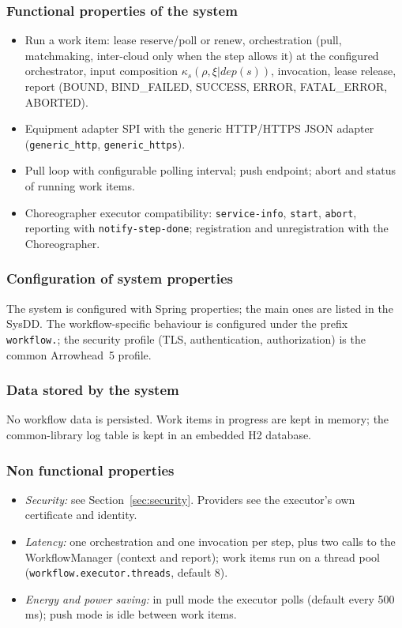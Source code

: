 \documentclass[a4paper]{arrowhead}
\begin{document}
\subsubsection{Functional properties of the system}
\begin{itemize}
\item Run a work item: lease reserve/poll or renew, orchestration (pull, matchmaking, inter-cloud only when the step
allows it) at the configured orchestrator, input composition $\kappa_s(\rho, \xi|dep(s))$, invocation, lease release,
report (BOUND, BIND\_FAILED, SUCCESS, ERROR, FATAL\_ERROR, ABORTED).
\item Equipment adapter SPI with the generic HTTP/HTTPS JSON adapter (\texttt{generic\_http}, \texttt{generic\_https}).
\item Pull loop with configurable polling interval; push endpoint; abort and status of running work items.
\item Choreographer executor compatibility: \texttt{service-info}, \texttt{start}, \texttt{abort}, reporting with
\texttt{notify-step-done}; registration and unregistration with the Choreographer.
\end{itemize}

\subsubsection{Configuration of system properties}
The system is configured with Spring properties; the main ones are listed in the SysDD. The workflow-specific behaviour
is configured under the prefix \texttt{workflow.}; the security profile (TLS, authentication, authorization) is the
common Arrowhead~5 profile.

\subsubsection{Data stored by the system}
No workflow data is persisted. Work items in progress are kept in memory; the common-library log table is kept in an
embedded H2 database.

\subsubsection{Non functional properties}
\begin{itemize}
\item \emph{Security:} see Section~\ref{sec:security}. Providers see the executor's own certificate and identity.
\item \emph{Latency:} one orchestration and one invocation per step, plus two calls to the WorkflowManager (context and
report); work items run on a thread pool (\texttt{workflow.executor.threads}, default 8).
\item \emph{Energy and power saving:} in pull mode the executor polls (default every 500\,ms); push mode is idle
between work items.
\end{itemize}
\end{document}
